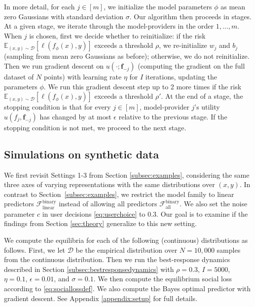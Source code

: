 \documentclass[letterpaper,11pt]{article}
\theoremstyle{plain}
\begin{document}
In more detail, for each $j \in [m]$, we initialize the model parameters $\phi$ as mean zero Gaussians with standard deviation $\sigma$. Our algorithm then proceeds in stages. At a given stage, we iterate through the model-providers in the order $1, \ldots, m$. When $j$ is chosen, first we decide whether to reinitialize: if the risk $\mathbb{E}_{(x,y) \sim \mathcal{D}}[\ell(f_{\phi}(x), y)]$ exceeds a threshold $\rho$, we re-initialize $w_j$ and $b_j$ (sampling from mean zero Gaussians as before); otherwise, we do not reinitialize. Then we run gradient descent on $u(\cdot; \mathbf{f}_{-j})$ (computing the gradient on the full dataset of $N$ points) with learning rate $\eta$ for $I$ iterations, updating the parameters $\phi$. We run this gradient descent step up to 2 more times if the risk $\mathbb{E}_{(x,y) \sim \mathcal{D}}[\ell(f_{\phi}(x), y)]$ exceeds a threshold $\rho'$. At the end of a stage, the stopping condition is that for every $j \in [m]$, model-provider $j$'s utility $u(f_j, \mathbf{f}_{-j})$ has changed by at most $\epsilon$ relative to the previous stage. If the stopping condition is not met, we proceed to the next stage. 

\subsection{Simulations on synthetic data}\label{subsec:synthetic}

We first revisit Settings 1-3 from Section \ref{subsec:examples}, considering the same three axes of varying representations with the same distributions over $(x,y)$. In contrast to Section~\ref{subsec:examples}, we restrict the model family to linear predictors $\mathcal{F}^{\text{binary}}_{\text{linear}}$ instead of allowing all predictors $\mathcal{F}^{\text{binary}}_{\text{all}}$. We also set the noise parameter $c$ in user decisions \eqref{eq:userchoice} to $0.3$. Our goal is to examine if the findings from Section \ref{sec:theory} generalize to this new setting. 

We compute the equilibria for each of the following (continuous) distributions as follows. First, we let $\mathcal{D}$ be the empirical distribution over $N = 10,000$ samples from the continuous distribution. Then we run the best-response dynamics described in Section \ref{subsec:bestresponsedynamics} with $\rho = 0.3$, $I = 5000$, $\eta = 0.1$, $\epsilon = 0.01$, and $\sigma = 0.1$. 
We then compute the equilibrium social loss according to \eqref{eq:sociallossdef}.  We also compute the Bayes optimal predictor with gradient descent. See Appendix \ref{appendix:setup} for full details. 
 
\end{document}
